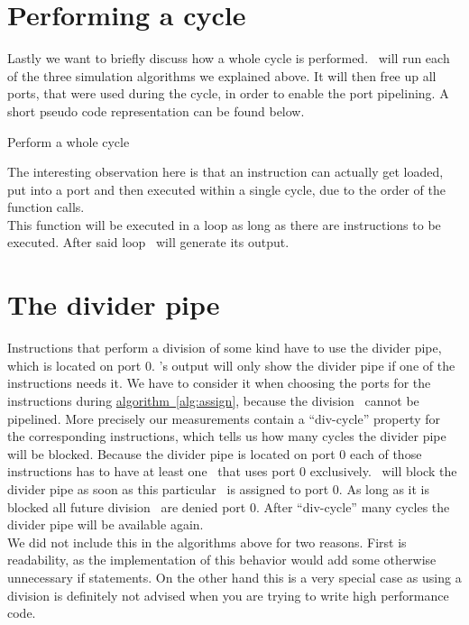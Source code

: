 \section{Performing a cycle}

Lastly we want to briefly discuss how a whole cycle is performed. \suaca\ will run each of the three simulation algorithms we explained above. It will then free up all ports, that were used during the cycle, in order to enable the port pipelining. A short pseudo code representation can be found below.

\begin{algorithm}[H]
    \SetAlgoLined
    \caption{Perform a whole cycle}
\end{algorithm}
\vspace{5pt}
The interesting observation here is that an instruction can actually get loaded, put into a port and then executed within a single cycle, due to the order of the function calls.\\
This function will be executed in a loop as long as there are instructions to be executed. After said loop \suaca\ will generate its output.


\section{The divider pipe}
\label{sec:dividerpipe}

Instructions that perform a division of some kind have to use the divider pipe, which is located on port $0$. \suaca's output will only show the divider pipe if one of the instructions needs it. We have to consider it when choosing the ports for the instructions during \hyperref[alg:assign]{algorithm~\ref*{alg:assign}}, because the division \microops\ cannot be pipelined. More precisely our measurements contain a ``div-cycle'' property for the corresponding instructions, which tells us how many cycles the divider pipe will be blocked. Because the divider pipe is located on port $0$ each of those instructions has to have at least one \microop\ that uses port $0$ exclusively. \suaca\ will block the divider pipe as soon as this particular \microop\ is assigned to port $0$. As long as it is blocked all future division \microops\ are denied port $0$. After ``div-cycle'' many cycles the divider pipe will be available again.\\
We did not include this in the algorithms above for two reasons. First is readability, as the implementation of this behavior would add some otherwise unnecessary if statements. On the other hand this is a very special case as using a division is definitely not advised when you are trying to write high performance code.
